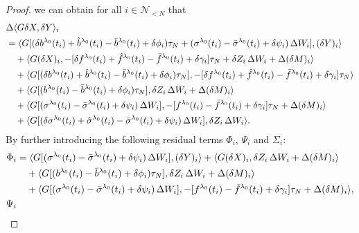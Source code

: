 \documentclass[11pt]{article}
\numberwithin{equation}{section}
\theoremstyle{definition}
\theoremstyle{remark}
\def\l{\label}  \def\f{\frac}  \def\fa{\forall}
\def \la{\langle} \def\ra{\rangle}
\def\cN{\mathcal{N}}
\begin{document}
\begin{proof}
we can obtain for all $i\in \cN_{<N}$ that
\begin{align*}%
\begin{split}
&\Delta \la G\delta X,\delta Y\ra_i
\\
&=
\la G[(\delta b^{\lambda_0}(t_{i})+\hat{b}^{\lambda_0}(t_{i})-\bar{b}^{\lam_0}(t_{i})+\delta \phi_{i})\tau_N+(\sigma^{\lambda_0}(t_i)-\bar{\sigma}^{\lambda_0}(t_i)+\delta \psi_{i})\,\Delta W_i], (\delta Y)_{i}\ra
\\
& \quad
+\la  G (\delta X)_i, -[\delta f^{\lambda_0}(t_{i})+\hat{f}^{\lambda_0}(t_{i})-\bar{f}^{\lambda_0}(t_{i})+\delta \gamma_i]\tau_N+\delta  {Z}_i\,\Delta W_i+\Delta (\delta {M})_i \ra
\\
&\quad
+
\la  G [(\delta b^{\lambda_0}(t_{i})+\hat{b}^{\lambda_0}(t_{i})-\bar{b}^{\lam_0}(t_{i})+\delta \phi_{i})\tau_N],
-[\delta f^{\lambda_0}(t_{i})+\hat{f}^{\lambda_0}(t_{i})-\bar{f}^{\lambda_0}(t_{i})+\delta \gamma_i]\tau_N
\ra
\\
&\quad
+
\la  G [(b^{\lambda_0}(t_{i})-\bar{b}^{\lam_0}(t_{i})+\delta \phi_{i})\tau_N], 
\delta  {Z}_i\,\Delta W_i+\Delta (\delta {M})_i
\ra
\\
&\quad
+
\la  G [(\sigma^{\lambda_0}(t_i)-\bar{\sigma}^{\lambda_0}(t_i)+\delta \psi_{i})\,\Delta W_i], 
-[f^{\lambda_0}(t_{i})-\bar{f}^{\lambda_0}(t_{i})+\delta \gamma_i]\tau_N+\Delta (\delta {M})_i
\ra
\\
&\quad
+
\la  G [(\delta\sigma^{\lambda_0}(t_i)+\hat{\sigma}^{\lambda_0}(t_{i})-\bar{\sigma}^{\lambda_0}(t_i)+\delta \psi_{i})\,\Delta W_i], 
\delta  {Z}_i\,\Delta W_i
\ra.
 \end{split}
  \end{align*}
By further introducing   the following residual terms $\Phi_i$,
 $\Psi_i$ and $\Sigma_i$:
  \begin{align*}
\Phi_i
&=
\la G[(\sigma^{\lambda_0}(t_i)-\bar{\sigma}^{\lambda_0}(t_i)+\delta \psi_{i})\,\Delta W_i], (\delta Y)_{i}\ra
%
+\la  G (\delta X)_i, \delta  {Z}_i\,\Delta W_i+\Delta (\delta {M})_i \ra
\\
&\quad
+
\la  G [(b^{\lambda_0}(t_{i})-\bar{b}^{\lam_0}(t_{i})+\delta \phi_{i})\tau_N], 
\delta  {Z}_i\,\Delta W_i+\Delta (\delta {M})_i
\ra
\\
&\quad
+
\la  G [(\sigma^{\lambda_0}(t_i)-\bar{\sigma}^{\lambda_0}(t_i)+\delta \psi_{i})\,\Delta W_i], 
-[f^{\lambda_0}(t_{i})-\bar{f}^{\lambda_0}(t_{i})+\delta \gamma_i]\tau_N+\Delta (\delta {M})_i
\ra,
\\
\Psi_i

\end{align*}
\end{proof}
\end{document}
